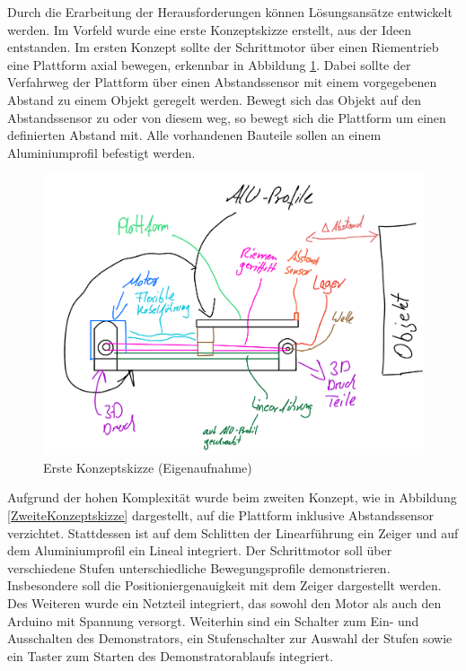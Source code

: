 Durch die Erarbeitung der Herausforderungen können Lösungsansätze entwickelt werden. Im Vorfeld wurde eine erste Konzeptskizze erstellt, aus der Ideen entstanden. Im ersten Konzept sollte der Schrittmotor über einen Riementrieb eine Plattform axial bewegen, erkennbar in Abbildung \ref{ErsteKonzeptskizze}. Dabei sollte der Verfahrweg der Plattform über einen Abstandssensor mit einem vorgegebenen Abstand zu einem Objekt geregelt werden. Bewegt sich das Objekt auf den Abstandssensor zu oder von diesem weg, so bewegt sich die Plattform um einen definierten Abstand mit. Alle vorhandenen Bauteile sollen an einem Aluminiumprofil befestigt werden.

\begin{figure}[htb]
	\begin{center}
		\includegraphics[width=\textwidth]{Images/Konzeptskizze1.png}
		\caption{Erste Konzeptskizze (Eigenaufnahme)} \label{ErsteKonzeptskizze}
\end{center}
\end{figure}  

Aufgrund der hohen Komplexität wurde beim zweiten Konzept, wie in Abbildung \ref{ZweiteKonzeptskizze} dargestellt, auf die Plattform inklusive Abstandssensor verzichtet. Stattdessen ist auf dem Schlitten der Linearführung ein Zeiger und auf dem Aluminiumprofil ein Lineal integriert. Der Schrittmotor soll über verschiedene Stufen unterschiedliche Bewegungsprofile demonstrieren. Insbesondere soll die Positioniergenauigkeit mit dem Zeiger dargestellt werden. Des Weiteren wurde ein Netzteil integriert, das sowohl den Motor als auch den Arduino mit Spannung versorgt. Weiterhin sind ein Schalter zum Ein- und Ausschalten des Demonstrators, ein Stufenschalter zur Auswahl der Stufen sowie ein Taster zum Starten des Demonstratorablaufs integriert.

